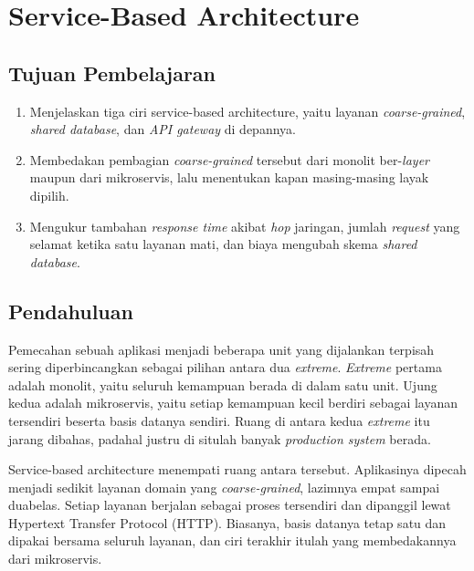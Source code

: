 \chapter{Service-Based Architecture}
\label{bab:layanan}

\section*{Tujuan Pembelajaran}

\begin{enumerate}
  \item Menjelaskan tiga ciri service-based architecture, yaitu layanan
    \textit{coarse-grained}, \textit{shared database}, dan \textit{API gateway} di
    depannya.
  \item Membedakan pembagian \textit{coarse-grained} tersebut dari monolit ber-\textit{layer}
    maupun dari mikroservis, lalu menentukan kapan masing-masing layak
    dipilih.
  \item Mengukur tambahan \textit{response time} akibat \textit{hop} jaringan, jumlah
    \textit{request} yang selamat ketika satu layanan mati, dan biaya mengubah skema
    \textit{shared database}.
\end{enumerate}

\section{Pendahuluan}

Pemecahan sebuah aplikasi menjadi beberapa unit yang dijalankan terpisah
sering diperbincangkan sebagai pilihan antara dua \textit{extreme}.
\textit{Extreme} pertama adalah
monolit, yaitu seluruh kemampuan berada di dalam satu unit. Ujung kedua
adalah
mikroservis, yaitu setiap kemampuan kecil berdiri sebagai layanan
tersendiri
beserta basis datanya sendiri. Ruang di antara kedua \textit{extreme} itu
jarang dibahas,
padahal justru di situlah banyak \textit{production system} berada.

Service-based
architecture
menempati ruang antara tersebut. Aplikasinya
dipecah menjadi sedikit layanan domain yang \textit{coarse-grained}, lazimnya empat
sampai duabelas. Setiap layanan berjalan sebagai proses tersendiri dan
dipanggil lewat Hypertext Transfer Protocol (HTTP). Biasanya, basis datanya
tetap satu dan dipakai bersama seluruh layanan, dan ciri terakhir itulah yang
membedakannya dari mikroservis.

